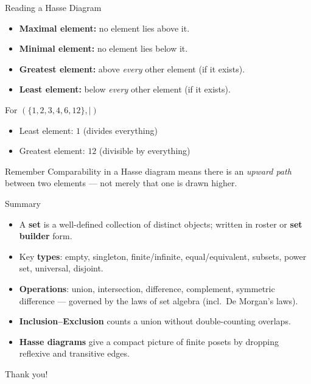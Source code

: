 \documentclass{beamer}
\begin{document}
\begin{frame}{Reading a Hasse Diagram}
  \begin{itemize}
    \item \textbf{Maximal element:} no element lies above it.
    \item \textbf{Minimal element:} no element lies below it.
    \item \textbf{Greatest element:} above \emph{every} other element
          (if it exists).
    \item \textbf{Least element:} below \emph{every} other element
          (if it exists).
  \end{itemize}
  \pause
  \begin{exampleblock}{For $(\{1,2,3,4,6,12\}, \mid)$}
    \begin{itemize}
      \item Least element: $1$ \quad (divides everything)
      \item Greatest element: $12$ \quad (divisible by everything)
    \end{itemize}
  \end{exampleblock}
  \pause
  \begin{alertblock}{Remember}
    Comparability in a Hasse diagram means there is an \emph{upward
    path} between two elements --- not merely that one is drawn higher.
  \end{alertblock}
\end{frame}

\begin{frame}{Summary}
  \begin{itemize}
    \item A \textbf{set} is a well-defined collection of distinct
          objects; written in roster or \textbf{set builder} form.
    \item Key \textbf{types}: empty, singleton, finite/infinite,
          equal/equivalent, subsets, power set, universal, disjoint.
    \item \textbf{Operations}: union, intersection, difference,
          complement, symmetric difference --- governed by the laws of
          set algebra (incl.\ De Morgan's laws).
    \item \textbf{Inclusion--Exclusion} counts a union without
          double-counting overlaps.
    \item \textbf{Hasse diagrams} give a compact picture of finite
          posets by dropping reflexive and transitive edges.
  \end{itemize}
  \vfill
  \begin{center}
    \Large Thank you!
  \end{center}
\end{frame}
\end{document}
